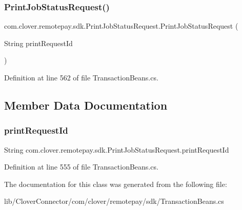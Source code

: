 \subsubsection{\texorpdfstring{Print\+Job\+Status\+Request()}{PrintJobStatusRequest()}\hspace{0.1cm}{\footnotesize\ttfamily [2/2]}}
{\footnotesize\ttfamily com.\+clover.\+remotepay.\+sdk.\+Print\+Job\+Status\+Request.\+Print\+Job\+Status\+Request (\begin{DoxyParamCaption}\item[{String}]{print\+Request\+Id }\end{DoxyParamCaption})}



Definition at line 562 of file Transaction\+Beans.\+cs.



\subsection{Member Data Documentation}
\mbox{\label{classcom_1_1clover_1_1remotepay_1_1sdk_1_1_print_job_status_request_ae4588c40cf7d2584db90a3c0dc615650}} 
\subsubsection{\texorpdfstring{print\+Request\+Id}{printRequestId}}
{\footnotesize\ttfamily String com.\+clover.\+remotepay.\+sdk.\+Print\+Job\+Status\+Request.\+print\+Request\+Id}



Definition at line 555 of file Transaction\+Beans.\+cs.



The documentation for this class was generated from the following file\+:\begin{DoxyCompactItemize}
\item 
lib/\+Clover\+Connector/com/clover/remotepay/sdk/Transaction\+Beans.\+cs\end{DoxyCompactItemize}
